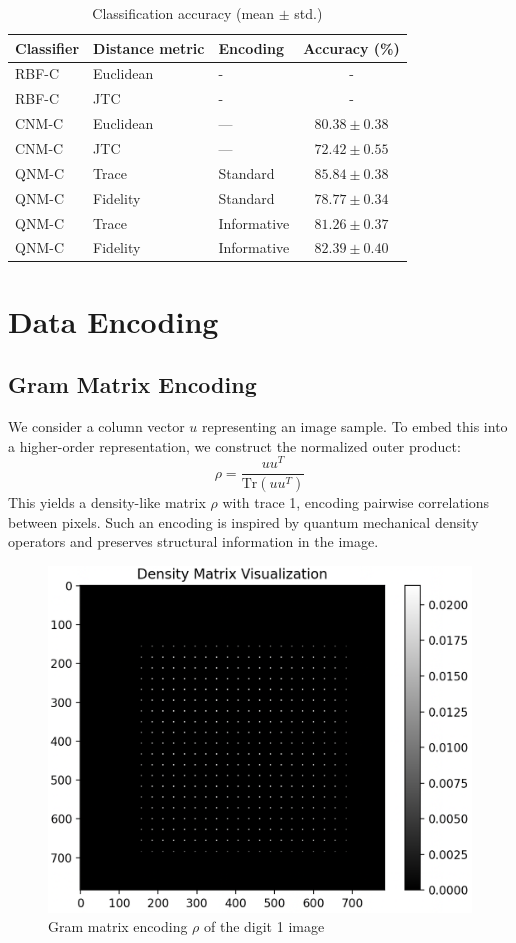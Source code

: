 \documentclass[twocolumn]{article} %
\begin{document}
\begin{table}[htbp]
  \centering
  \caption{Classification accuracy (mean $\pm$ std.)}
  \label{tab:cls-results}
  \begin{tabular}{@{}lll c@{}}
    \toprule
    Classifier & Distance metric & Encoding & Accuracy (\%)\\ 
    \midrule
    RBF-C & Euclidean & - & - \\
    RBF-C & JTC & - & - \\[2pt]
    CNM-C & Euclidean & — & $80.38 \pm 0.38$ \\ 
    CNM-C & JTC & — & $72.42 \pm 0.55$ \\[2pt]
    QNM-C & Trace     & Standard     & \textbf{$85.84 \pm 0.38$} \\ 
    QNM-C & Fidelity  & Standard     & $78.77 \pm 0.34$ \\[2pt]
    QNM-C & Trace     & Informative  & $81.26 \pm 0.37$ \\ 
    QNM-C & Fidelity  & Informative  & \textbf{$82.39 \pm 0.40$} \\ 
    \bottomrule
  \end{tabular}
\end{table}




\section{Data Encoding}
\subsection{Gram Matrix Encoding}

We consider a column vector $u$ representing an image sample. To embed this into a higher-order representation, we construct the normalized outer product:
\[
\rho = \frac{uu^T}{\text{Tr}(uu^T)}
\]
This yields a density-like matrix $\rho$ with trace 1, encoding pairwise correlations between pixels. Such an encoding is inspired by quantum mechanical density operators and preserves structural information in the image.

\begin{figure}[h!]
    \centering
    \includegraphics[width=0.6\linewidth]{figures/density_matrix_nmist_one.png}
    \caption{Gram matrix encoding $\rho$ of the digit 1 image}
    \label{fig:density_matrix}
\end{figure}
\end{document}
